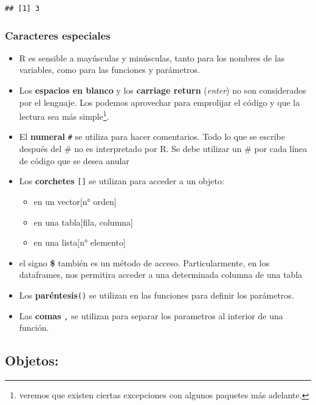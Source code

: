 \documentclass[]{book}
\providecommand{\tightlist}{%
  \setlength{\itemsep}{0pt}\setlength{\parskip}{0pt}}
\let\rmarkdownfootnote\footnote%
\def\footnote{\protect\rmarkdownfootnote}
\begin{document}
\begin{verbatim}
## [1] 3
\end{verbatim}

\hypertarget{caracteres-especiales}{%
\subsubsection{Caracteres especiales}\label{caracteres-especiales}}

\begin{itemize}
\tightlist
\item
  R es sensible a mayúsculas y minúsculas, tanto para los nombres de las variables, como para las funciones y parámetros.
\item
  Los \textbf{espacios en blanco} y los \textbf{carriage return} (\emph{enter}) no son considerados por el lenguaje. Los podemos aprovechar para emprolijar el código y que la lectura sea más simple\footnote{veremos que existen ciertas excepciones con algunos paquetes más adelante.}.
\end{itemize}

\begin{itemize}
\item
  El \textbf{numeral} \texttt{\#} se utiliza para hacer comentarios. Todo lo que se escribe después del \# no es interpretado por R. Se debe utilizar un \# por cada línea de código que se desea anular
\item
  Los \textbf{corchetes} \texttt{{[}{]}} se utilizan para acceder a un objeto:

  \begin{itemize}
  \tightlist
  \item
    en un vector{[}n° orden{]}
  \item
    en una tabla{[}fila, columna{]}
  \item
    en una lista{[}n° elemento{]}
  \end{itemize}
\item
  el signo \textbf{\$} también es un método de acceso. Particularmente, en los dataframes, nos permitira acceder a una determinada columna de una tabla
\item
  Los \textbf{paréntesis}\texttt{()} se utilizan en las funciones para definir los parámetros.
\item
  Las \textbf{comas} \texttt{,} se utilizan para separar los parametros al interior de una función.
\end{itemize}

\hypertarget{objetos}{%
\subsection{Objetos:}\label{objetos}}
\end{document}
